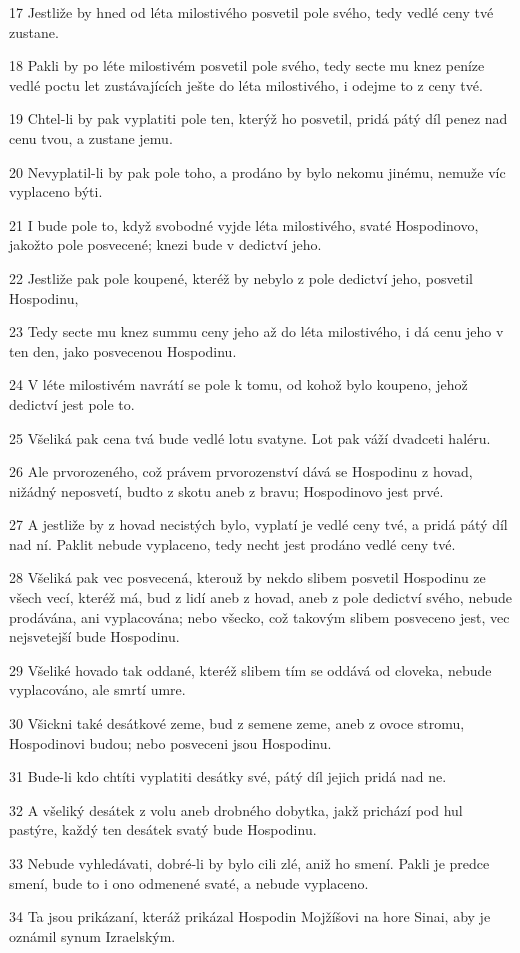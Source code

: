 \par 17 Jestliže by hned od léta milostivého posvetil pole svého, tedy vedlé ceny tvé zustane.
\par 18 Pakli by po léte milostivém posvetil pole svého, tedy secte mu knez peníze vedlé poctu let zustávajících ješte do léta milostivého, i odejme to z ceny tvé.
\par 19 Chtel-li by pak vyplatiti pole ten, kterýž ho posvetil, pridá pátý díl penez nad cenu tvou, a zustane jemu.
\par 20 Nevyplatil-li by pak pole toho, a prodáno by bylo nekomu jinému, nemuže víc vyplaceno býti.
\par 21 I bude pole to, když svobodné vyjde léta milostivého, svaté Hospodinovo, jakožto pole posvecené; knezi bude v dedictví jeho.
\par 22 Jestliže pak pole koupené, kteréž by nebylo z pole dedictví jeho, posvetil Hospodinu,
\par 23 Tedy secte mu knez summu ceny jeho až do léta milostivého, i dá cenu jeho v ten den, jako posvecenou Hospodinu.
\par 24 V léte milostivém navrátí se pole k tomu, od kohož bylo koupeno, jehož dedictví jest pole to.
\par 25 Všeliká pak cena tvá bude vedlé lotu svatyne. Lot pak váží dvadceti haléru.
\par 26 Ale prvorozeného, což právem prvorozenství dává se Hospodinu z hovad, nižádný neposvetí, budto z skotu aneb z bravu; Hospodinovo jest prvé.
\par 27 A jestliže by z hovad necistých bylo, vyplatí je vedlé ceny tvé, a pridá pátý díl nad ní. Paklit nebude vyplaceno, tedy necht jest prodáno vedlé ceny tvé.
\par 28 Všeliká pak vec posvecená, kterouž by nekdo slibem posvetil Hospodinu ze všech vecí, kteréž má, bud z lidí aneb z hovad, aneb z pole dedictví svého, nebude prodávána, ani vyplacována; nebo všecko, což takovým slibem posveceno jest, vec nejsvetejší bude Hospodinu.
\par 29 Všeliké hovado tak oddané, kteréž slibem tím se oddává od cloveka, nebude vyplacováno, ale smrtí umre.
\par 30 Všickni také desátkové zeme, bud z semene zeme, aneb z ovoce stromu, Hospodinovi budou; nebo posveceni jsou Hospodinu.
\par 31 Bude-li kdo chtíti vyplatiti desátky své, pátý díl jejich pridá nad ne.
\par 32 A všeliký desátek z volu aneb drobného dobytka, jakž prichází pod hul pastýre, každý ten desátek svatý bude Hospodinu.
\par 33 Nebude vyhledávati, dobré-li by bylo cili zlé, aniž ho smení. Pakli je predce smení, bude to i ono odmenené svaté, a nebude vyplaceno.
\par 34 Ta jsou prikázaní, kteráž prikázal Hospodin Mojžíšovi na hore Sinai, aby je oznámil synum Izraelským.

